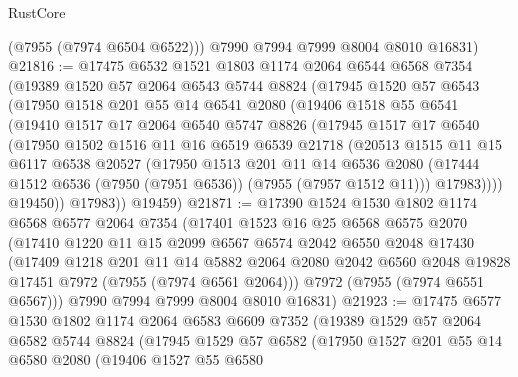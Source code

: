 \begin{lexlean}{RustCore}
\begin{coremodule}
        (@7955 (@7974 @6504 @6522)))
      @7990
      @7994
      @7999
      @8004
      @8010
      @16831)
@21816 := @17475
    @6532
    @1521
    @1803
    @1174
    @2064
    @6544
    @6568
    @7354
    (@19389
      @1520
      @57
      @2064
      @6543
      @5744
      @8824
      (@17945
        @1520
        @57
        @6543
        (@17950
          @1518
          @201
          @55
          @14
          @6541
          @2080
          (@19406
            @1518
            @55
            @6541
            (@19410
              @1517
              @17
              @2064
              @6540
              @5747
              @8826
              (@17945
                @1517
                @17
                @6540
                (@17950
                  @1502
                  @1516
                  @11
                  @16
                  @6519
                  @6539
                  @21718
                  (@20513
                    @1515
                    @11
                    @15
                    @6117
                    @6538
                    @20527
                    (@17950
                      @1513
                      @201
                      @11
                      @14
                      @6536
                      @2080
                      (@17444 @1512 @6536 (@7950 (@7951 @6536)) (@7955 (@7957 @1512 @11)))
                      @17983))))
              @19450))
          @17983))
      @19459)
@21871 := @17390
    @1524
    @1530
    @1802
    @1174
    @6568
    @6577
    @2064
    @7354
    (@17401
      @1523
      @16
      @25
      @6568
      @6575
      @2070
      (@17410
        @1220
        @11
        @15
        @2099
        @6567
        @6574
        @2042
        @6550
        @2048
        @17430
        (@17409
          @1218
          @201
          @11
          @14
          @5882
          @2064
          @2080
          @2042
          @6560
          @2048
          @19828
          @17451
          @7972
          (@7955 (@7974 @6561 @2064)))
        @7972
        (@7955 (@7974 @6551 @6567)))
      @7990
      @7994
      @7999
      @8004
      @8010
      @16831)
@21923 := @17475
    @6577
    @1530
    @1802
    @1174
    @2064
    @6583
    @6609
    @7352
    (@19389
      @1529
      @57
      @2064
      @6582
      @5744
      @8824
      (@17945
        @1529
        @57
        @6582
        (@17950
          @1527
          @201
          @55
          @14
          @6580
          @2080
          (@19406
            @1527
            @55
            @6580

\end{coremodule}
\end{lexlean}
